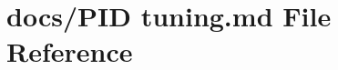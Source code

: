 \hypertarget{PID_01tuning_8md}{\section{docs/\+P\+I\+D tuning.\+md File Reference}
\label{PID_01tuning_8md}
}
